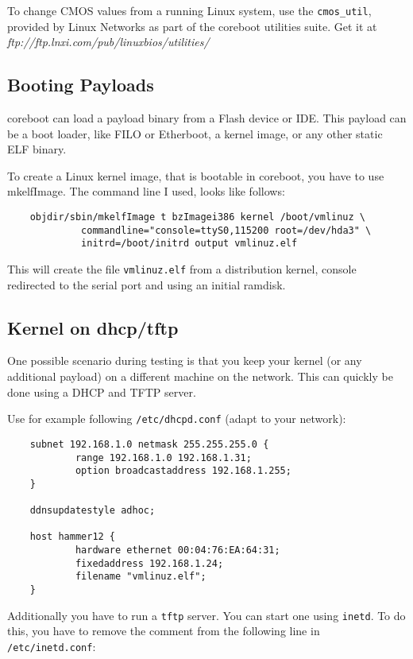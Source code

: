 \documentclass[titlepage,12pt]{article}
\begin{document}
To change CMOS values from a running Linux system, use the
\texttt{cmos\_util}, provided by Linux Networks as part of the coreboot
utilities suite. Get it at
\textit{ftp://ftp.lnxi.com/pub/linuxbios/utilities/}

\subsection {Booting Payloads}
coreboot can load a payload binary from a Flash device or IDE. This
payload can be a boot loader, like FILO or Etherboot, a kernel image, or
any other static ELF binary.

To create a Linux kernel image, that is bootable in coreboot, you have
to use mkelfImage. The command line I used, looks like follows:

\begin{verbatim}
    objdir/sbin/mkelfImage t bzImagei386 kernel /boot/vmlinuz \
             commandline="console=ttyS0,115200 root=/dev/hda3" \
             initrd=/boot/initrd output vmlinuz.elf
\end{verbatim}


This will create the file \texttt{vmlinuz.elf} from a distribution
kernel, console redirected to the serial port and using an initial
ramdisk.

\subsection{Kernel on dhcp/tftp}

One possible scenario during testing is that you keep your kernel (or
any additional payload) on a different machine on the network. This can
quickly be done using a DHCP and TFTP server.

Use for example following \texttt{/etc/dhcpd.conf} (adapt to your
network):

\begin{verbatim}
    subnet 192.168.1.0 netmask 255.255.255.0 {
            range 192.168.1.0 192.168.1.31;
            option broadcastaddress 192.168.1.255;
    }

    ddnsupdatestyle adhoc;

    host hammer12 {
            hardware ethernet 00:04:76:EA:64:31;
            fixedaddress 192.168.1.24;
            filename "vmlinuz.elf";
    }
\end{verbatim}


Additionally you have to run a \texttt{tftp} server. You can start one
using \texttt{inetd}.  To do this, you have to remove the comment from
the following line in \texttt{/etc/inetd.conf}:
\end{document}
